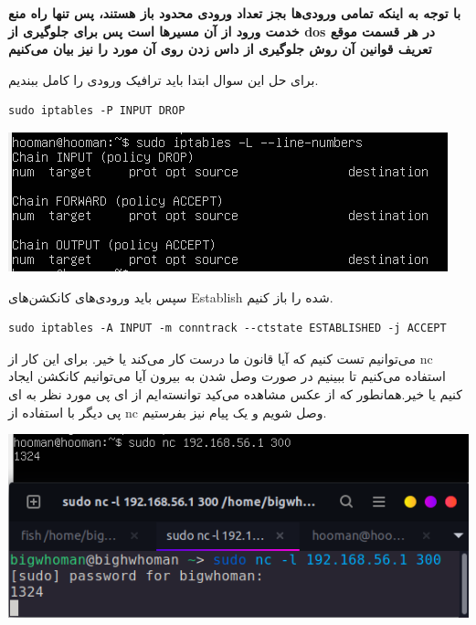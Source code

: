 \begin{center}
    \textbf{
    با توجه به اینکه تمامی ورودی‌ها بجز تعداد ورودی محدود باز هستند، پس تنها راه منع خدمت ورود از آن مسیرها است پس 
    برای جلوگیری از dos در هر قسمت موقع تعریف قوانین آن روش جلوگیری از 
    داس زدن روی آن مورد را نیز بیان می‌کنیم}
\end{center}
برای حل این سوال ابتدا باید ترافیک ورودی را کامل ببندیم.
\begin{latin}
\begin{lstlisting}
sudo iptables -P INPUT DROP
\end{lstlisting}
\end{latin}
\begin{center}
    \includegraphics[scale=0.45]{pics/iptables1.png}
\end{center}
سپس باید ورودی‌های کانکشن‌های Establish شده را باز کنیم.
\begin{latin}   
\begin{lstlisting}
sudo iptables -A INPUT -m conntrack --ctstate ESTABLISHED -j ACCEPT
\end{lstlisting}
\end{latin}
می‌توانیم تست کنیم که آیا قانون ما درست کار می‌کند یا خیر.
برای این کار از nc استفاده می‌کنیم تا ببینیم در صورت 
وصل شدن به بیرون آیا می‌توانیم کانکشن ایجاد کنیم یا خیر.همانطور که از عکس مشاهده می‌کید توانسته‌ایم از ای پی مورد نظر به ای پی دیگر با استفاده از nc وصل 
شویم و یک پیام نیز بفرستیم.
\begin{center}
    \includegraphics[scale=0.40]{pics/iptables2.png}
\end{center}
